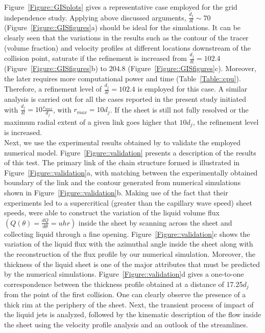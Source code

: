 \documentclass[%
aip,
sd,%
amsmath,amssymb,
preprint,%
author-year,%
]{revtex4-1}
\begin{document}
Figure~\ref{Figure::GISplots} gives a representative case employed for the grid independence study. Applying above discussed arguments, $\frac{d_j}{\delta l} \sim 70$ (Figure~\ref{Figure::GISfigures}a) should be ideal for the simulations. It can be  clearly seen that the variations in the results such as the contour of the tracer (volume fraction) and velocity profiles at different locations downstream of the collision point, saturate if the refinement is increased from $\frac{d_j}{\delta l} = 102.4$ (Figure~\ref{Figure::GISfigures}b) to $204.8$ (Figure~\ref{Figure::GISfigures}c). Moreover, the later requires more computational power and time (Table~\ref{Table::cpu}). Therefore, a refinement level of $\frac{d_j}{\delta l} = 102.4$ is employed for this case. A similar analysis is carried out for all the cases reported in the present study initiated with $\frac{d_j}{\delta l} = 10\frac{r_{max}}{d_j}$, with $r_{max} = 10d_j$. If the sheet is still not fully resolved or the maximum radial extent of a given link goes higher that $10d_j$, the refinement level is increased.\\
Next, we use the experimental results obtained by \cite{bush2004collision} to validate the employed numerical model. Figure~\ref{Figure::validation} presents a description of the results of this test. The primary link of the chain structure formed is illustrated in Figure~\ref{Figure::validation}a, with matching between the experimentally obtained boundary of the link and the contour generated from numerical simulations shown in Figure~\ref{Figure::validation}b. Making use of the fact that their experiments led to a supercritical (greater than the capillary wave speed) sheet speeds, \cite{bush2004collision} were able to construct the variation of the liquid volume flux $\left(Q(\theta) = \frac{dQ}{d\theta} = uhr\right)$ inside the sheet by scanning across the sheet and collecting liquid through a fine opening. Figure~\ref{Figure::validation}c shows the variation of the liquid flux with the azimuthal angle inside the sheet along with the reconstruction of the flux profile by our numerical simulation. Moreover, the thickness of the liquid sheet is one of the major attributes that must be predicted by the numerical simulations. Figure~\ref{Figure::validation}d gives a one-to-one correspondence between the thickness profile obtained at a distance of 17.25$d_j$ from the point of the first collision. One can clearly observe the presence of a thick rim at the periphery of the sheet. Next, the transient process of impact of the liquid jets is analyzed, followed by the kinematic description of the flow inside the sheet using the velocity profile analysis and an outlook of the streamlines. 
\end{document}
